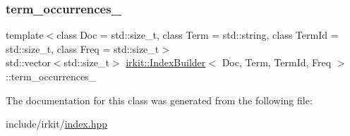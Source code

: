 \mbox{\label{classirkit_1_1IndexBuilder_aaa27520f3a0fb37dba049d2c26ad9484}} 
\subsubsection{\texorpdfstring{term\+\_\+occurrences\+\_\+}{term\_occurrences\_}}
{\footnotesize\ttfamily template$<$class Doc  = std\+::size\+\_\+t, class Term  = std\+::string, class Term\+Id  = std\+::size\+\_\+t, class Freq  = std\+::size\+\_\+t$>$ \\
std\+::vector$<$std\+::size\+\_\+t$>$ \mbox{\hyperlink{classirkit_1_1IndexBuilder}{irkit\+::\+Index\+Builder}}$<$ Doc, Term, Term\+Id, Freq $>$\+::term\+\_\+occurrences\+\_\+\hspace{0.3cm}{\ttfamily [protected]}}



The documentation for this class was generated from the following file\+:\begin{DoxyCompactItemize}
\item 
include/irkit/\mbox{\hyperlink{irkit_2index_8hpp}{index.\+hpp}}\end{DoxyCompactItemize}
